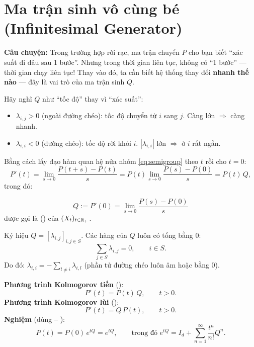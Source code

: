 \section{Ma trận sinh vô cùng bé (Infinitesimal Generator)}
\label{sec:generator}

\textbf{Câu chuyện:} Trong trường hợp rời rạc, ma trận chuyển $P$ cho bạn biết ``xác suất đi đâu sau 1 bước''.
Nhưng trong thời gian liên tục, không có ``1 bước'' --- thời gian chạy liên tục!
Thay vào đó, ta cần biết hệ thống thay đổi \textbf{nhanh thế nào} --- đây là vai trò của ma trận sinh $Q$.

Hãy nghĩ $Q$ như ``tốc độ'' thay vì ``xác suất'':
\begin{itemize}[nosep]
  \item $\lambda_{i,j} > 0$ (ngoài đường chéo): tốc độ chuyển từ $i$ sang $j$. Càng lớn $\Rightarrow$ càng nhanh.
  \item $\lambda_{i,i} < 0$ (đường chéo): tốc độ rời khỏi $i$. $|\lambda_{i,i}|$ lớn $\Rightarrow$ ở $i$ rất ngắn.
\end{itemize}

Bằng cách lấy đạo hàm quan hệ nửa nhóm \eqref{eq:semigroup} theo $t$ rồi cho $t = 0$:
\[
  P'(t) = \lim_{s \to 0} \frac{P(t+s) - P(t)}{s} = P(t) \lim_{s \to 0} \frac{P(s) - P(0)}{s} = P(t)\,Q,
\]
trong đó:

\begin{dinhnghia}
\[
  Q := P'(0) = \lim_{s \to 0} \frac{P(s) - P(0)}{s}
\]
được gọi là  () của $(X_t)_{t\in\mathbb{R}_+}$.
\end{dinhnghia}

Ký hiệu $Q = [\lambda_{i,j}]_{i,j\in S}$. Các hàng của $Q$ luôn có tổng bằng 0:
\[
  \sum_{j \in S} \lambda_{i,j} = 0, \qquad i \in S.
\]
Do đó: $\lambda_{i,i} = -\sum_{l \neq i} \lambda_{i,l}$ (phần tử đường chéo luôn âm hoặc bằng 0).

\begin{congthuc}
\textbf{Phương trình Kolmogorov tiến} ():
\begin{equation}\label{eq:forward-kolmogorov}
  P'(t) = P(t)\,Q, \qquad t > 0.
\end{equation}
\textbf{Phương trình Kolmogorov lùi} ():
\begin{equation}\label{eq:backward-kolmogorov}
  P'(t) = Q\,P(t), \qquad t > 0.
\end{equation}
\textbf{Nghiệm} (dùng  -- ):
\[
  P(t) = P(0)\,e^{tQ} = e^{tQ}, \qquad \text{trong đó } e^{tQ} = I_d + \sum_{n=1}^{\infty} \frac{t^n}{n!} Q^n.
\]
\end{congthuc}

